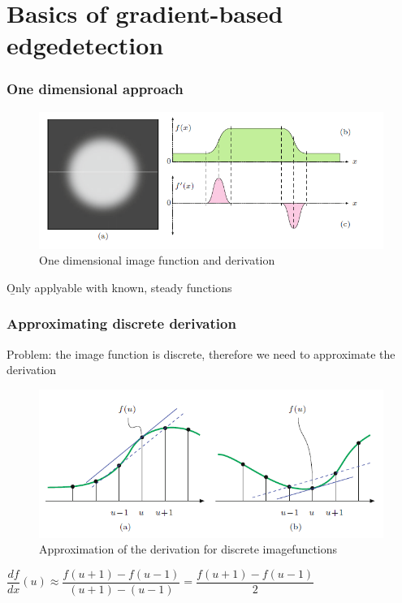 \section{Basics of gradient-based edgedetection}

\begin{frame}
	\frametitle{One dimensional approach}
	\begin{center}
		\begin{figure}
			\centering
			\includegraphics[width=0.7\linewidth]{images/1DGradient}
			\caption[1D Gradient]{One dimensional image function and derivation}
			\label{fig:1dgradient}
		\end{figure}
		\b{Only applyable with known, steady functions}
	\end{center}
\end{frame}

\begin{frame}
	\frametitle{Approximating discrete derivation}
	Problem: the image function is discrete, therefore we need to approximate the derivation
	\begin{center}
		\begin{figure}
			\centering
			\includegraphics[width=0.7\linewidth]{images/1DGradientApproximation}
			\caption[1D Gradient Approximation]{Approximation of the derivation for discrete imagefunctions}
			\label{fig:1dgradientapprox}
		\end{figure}
		$\dfrac{df}{dx}(u) \approx \dfrac{f(u+1) - f(u-1)}{(u+1)-(u-1)} = \dfrac{f(u+1) - f(u-1)}{2}$
	\end{center}
\end{frame}

